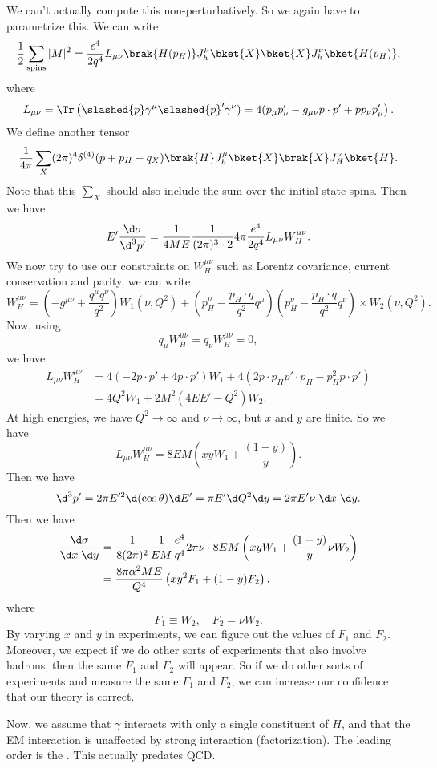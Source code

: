 \documentclass[a4paper]{article}
\begin{document}
We can't actually compute this non-perturbatively. So we again have to parametrize this. We can write
\[
  \frac{1}{2} \sum_{\mathrm{spins}} |M|^2 = \frac{e^4}{2q^4} L_{\mu\nu} \brak{H(p_H)} J_h^\mu \bket{X} \bket{X} J^\nu_h\bket{H(p_H)},
\]
where
\[
  L_{\mu\nu} = \Tr \left(\slashed{p} \gamma^\mu \slashed{p}' \gamma^\nu) = 4(p_\mu p'_\nu - g_{\mu\nu} p \cdot p' + pp_\nu p_\mu'\right).
\]
We define another tensor
\[
  \frac{1}{4\pi} \sum_X (2\pi)^4 \delta^{(4)} (p + p_H - q_X) \brak{H}J_h^\mu \bket{X} \brak{X} J_H^\nu \bket{H}.
\]
Note that this $\sum_X$ should also include the sum over the initial state spins. Then we have
\[
  E' \frac{\d \sigma}{\d^3 p'} = \frac{1}{4ME} \frac{1}{(2\pi)^3 \cdot 2} 4\pi \frac{e^4}{2q^4} L_{\mu\nu} W^{\mu\nu}_H.
\]
We now try to use our constraints on $W^{\mu\nu}_H$ such as Lorentz covariance, current conservation and parity, we can write
\[
  W_H^{\mu\nu} = \left(- g^{\mu\nu} + \frac{q^\mu q^\nu}{q^2}\right) W_1(\nu, Q^2) + \left(p_H^\mu - \frac{p_H \cdot q}{q^2} q^\mu\right) \left(p_H^\nu - \frac{p_H \cdot q}{q^2}q^\nu\right) \times W_2(\nu, Q^2).
\]
Now, using
\[
  q_\mu W_H^{\mu\nu} = q_\nu W_H^{\mu\nu} = 0,
\]
we have
\begin{align*}
  L_{\mu\nu} W_H^{\mu\nu} &= 4 (-2 p\cdot p' + 4 p\cdot p') W_1 + 4(2 p\cdot p_H p'\cdot p_H - p_H^2 p \cdot p')\\
  &= 4Q^2 W_1 + 2M^2 (4 EE' - Q^2)W_2.
\end{align*}
At high energies, we have $Q^2 \to \infty$ and $\nu \to \infty$, but $x$ and $y$ are finite. So we have
\[
  L_{\mu\nu} W^{\mu\nu}_H = 8EM \left(xy W_1 + \frac{(1 - y)}{y}\right).
\]
Then we have
\[
  \d^3 p' = 2\pi E'^2 \d (\cos \theta) \d E' = \pi E' \d Q^2 \d y = 2\pi E' \nu\;\d x\;\d y.
\]
Then we have
\begin{align*}
  \frac{\d \sigma}{\d x\; \d y} &= \frac{1}{8(2\pi)^2} \frac{1}{EM} \frac{e^4}{q^4} 2\pi \nu \cdot 8EM\left(xy W_1 + \frac{(1 - y)}{y} \nu W_2\right)\\
  &= \frac{8 \pi \alpha^2 ME}{Q^4}\left( xy^2 F_1 + (1 - y) F_2\right),
\end{align*}
where
\[
  F_1 \equiv W_2,\quad F_2 = \nu W_2.
\]
By varying $x$ and $y$ in experiments, we can figure out the values of $F_1$ and $F_2$. Moreover, we expect if we do other sorts of experiments that also involve hadrons, then the same $F_1$ and $F_2$ will appear. So if we do other sorts of experiments and measure the same $F_1$ and $F_2$, we can increase our confidence that our theory is correct.

Now, we assume that $\gamma$ interacts with only a single constituent of $H$, and that the EM interaction is unaffected by strong interaction (factorization). The leading order is the . This actually predates QCD.
\end{document}
